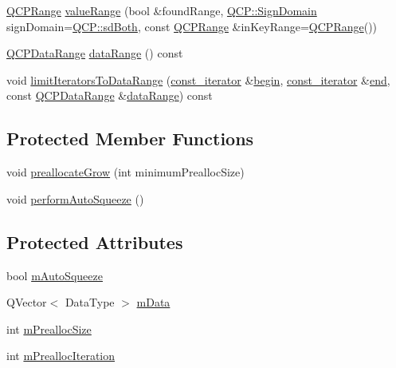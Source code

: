 \begin{DoxyCompactItemize}
\hyperlink{class_q_c_p_range}{Q\+C\+P\+Range} \hyperlink{class_q_c_p_data_container_a35a102dc2424d1228fc374d9313efbe9}{value\+Range} (bool \&found\+Range, \hyperlink{namespace_q_c_p_afd50e7cf431af385614987d8553ff8a9}{Q\+C\+P\+::\+Sign\+Domain} sign\+Domain=\hyperlink{namespace_q_c_p_afd50e7cf431af385614987d8553ff8a9aa38352ef02d51ddfa4399d9551566e24}{Q\+C\+P\+::sd\+Both}, const \hyperlink{class_q_c_p_range}{Q\+C\+P\+Range} \&in\+Key\+Range=\hyperlink{class_q_c_p_range}{Q\+C\+P\+Range}())
\item 
\hyperlink{class_q_c_p_data_range}{Q\+C\+P\+Data\+Range} \hyperlink{class_q_c_p_data_container_aece90eeb2ba8d3c46d3d94023630fbc7}{data\+Range} () const
\item 
void \hyperlink{class_q_c_p_data_container_aa1b36f5ae86a5a5a0b92141d3a0945c4}{limit\+Iterators\+To\+Data\+Range} (\hyperlink{class_q_c_p_data_container_ae40a91f5cb0bcac61d727427449b7d15}{const\+\_\+iterator} \&\hyperlink{class_q_c_p_data_container_a80032518413ab8f418f7c81182fd06cb}{begin}, \hyperlink{class_q_c_p_data_container_ae40a91f5cb0bcac61d727427449b7d15}{const\+\_\+iterator} \&\hyperlink{class_q_c_p_data_container_acf66dfad83fe041380f5e0491e7676f2}{end}, const \hyperlink{class_q_c_p_data_range}{Q\+C\+P\+Data\+Range} \&\hyperlink{class_q_c_p_data_container_aece90eeb2ba8d3c46d3d94023630fbc7}{data\+Range}) const
\end{DoxyCompactItemize}
\subsection*{Protected Member Functions}
\begin{DoxyCompactItemize}
\item 
void \hyperlink{class_q_c_p_data_container_aae8cdb2bcc3b900ec22f26df3e7d67c7}{preallocate\+Grow} (int minimum\+Prealloc\+Size)
\item 
void \hyperlink{class_q_c_p_data_container_a83c25ac14be1c920df85e797ee75c982}{perform\+Auto\+Squeeze} ()
\end{DoxyCompactItemize}
\subsection*{Protected Attributes}
\begin{DoxyCompactItemize}
\item 
bool \hyperlink{class_q_c_p_data_container_aae64c517d64511ad7a81ff8ee7b29147}{m\+Auto\+Squeeze}
\item 
Q\+Vector$<$ Data\+Type $>$ \hyperlink{class_q_c_p_data_container_a74906b4da829849c4062b5337c72585d}{m\+Data}
\item 
int \hyperlink{class_q_c_p_data_container_a3554d3ad00e69f7ce057efa00ea6f4b2}{m\+Prealloc\+Size}
\item 
int \hyperlink{class_q_c_p_data_container_ab2115bf023c29691f441eaf1889de84a}{m\+Prealloc\+Iteration}
\end{DoxyCompactItemize}
